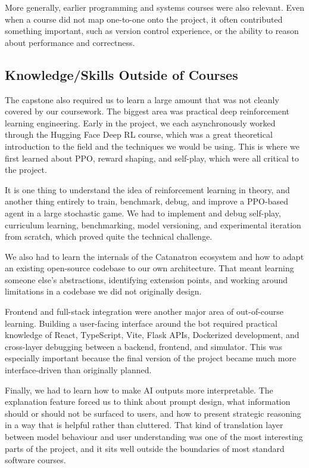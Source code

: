\documentclass{article}
\begin{document}
More generally, earlier programming and systems courses were also relevant.
Even when a course did not map one-to-one onto the project, it often contributed something important,
such as version control experience, or the ability to reason about performance and correctness.

\subsection{Knowledge/Skills Outside of Courses}


The capstone also required us to learn a large amount that was not cleanly covered by our coursework.
The biggest area was practical deep reinforcement learning engineering.
Early in the project, we each asynchronously worked through the Hugging Face Deep RL course, which was a great
theoretical introduction to the field and the techniques we would be using.
This is where we first learned about PPO, reward shaping, and self-play, which were all critical to the project.

It is one thing to understand the idea of reinforcement learning in theory, and another thing entirely to train,
benchmark, debug, and improve a PPO-based agent in a large stochastic game.
We had to implement and debug self-play, curriculum learning, benchmarking, model versioning, and experimental
iteration from scratch, which proved quite the technical challenge.

We also had to learn the internals of the Catanatron ecosystem and how to adapt an existing open-source
codebase to our own architecture.
That meant learning someone else's abstractions, identifying extension points, and working around
limitations in a codebase we did not originally design.

Frontend and full-stack integration were another major area of out-of-course learning.
Building a user-facing interface around the bot required practical knowledge of React, TypeScript, Vite,
Flask APIs, Dockerized development, and cross-layer debugging between a backend, frontend, and simulator.
This was especially important because the final version of the project became much more interface-driven
than originally planned.

Finally, we had to learn how to make AI outputs more interpretable.
The explanation feature forced us to think about prompt design, what information should or should not be
surfaced to users, and how to present strategic reasoning in a way that is helpful rather than cluttered.
That kind of translation layer between model behaviour and user understanding was one of the most
interesting parts of the project, and it sits well outside the boundaries of most standard software courses.
\end{document}
